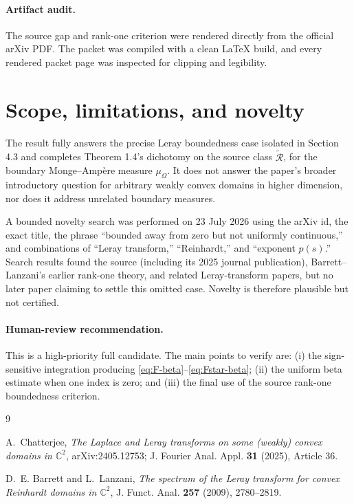 \documentclass[11pt]{article}
\newcommand{\Rclass}{\widetilde{\mathcal R}}
\begin{document}
\paragraph{Artifact audit.}
The source gap and rank-one criterion were rendered directly from the
official arXiv PDF.  The packet was compiled with a clean LaTeX build, and
every rendered packet page was inspected for clipping and legibility.

\section{Scope, limitations, and novelty}

The result fully answers the precise Leray boundedness case isolated in
Section 4.3 and completes Theorem 1.4's dichotomy on the source class
\(\Rclass\), for the boundary Monge--Amp\`ere measure \(\mu_\Omega\).
It does not answer the paper's broader introductory question for arbitrary
weakly convex domains in higher dimension, nor does it address unrelated
boundary measures.

A bounded novelty search was performed on 23 July 2026 using the arXiv id,
the exact title, the phrase ``bounded away from zero but not uniformly
continuous,'' and combinations of ``Leray transform,'' ``Reinhardt,'' and
``exponent \(p(s)\).''  Search results found the source (including its 2025
journal publication), Barrett--Lanzani's earlier rank-one theory, and related
Leray-transform papers, but no later paper claiming to settle this omitted
case.  Novelty is therefore plausible but not certified.

\paragraph{Human-review recommendation.}
This is a high-priority full candidate.  The main points to verify are:
(i) the sign-sensitive integration producing
\eqref{eq:F-beta}--\eqref{eq:Fstar-beta};
(ii) the uniform beta estimate when one index is zero; and
(iii) the final use of the source rank-one boundedness criterion.

\begin{thebibliography}{9}

A.~Chatterjee,
\emph{The Laplace and Leray transforms on some (weakly) convex domains in
\(\mathbb C^2\)},
arXiv:2405.12753; J. Fourier Anal. Appl. \textbf{31} (2025), Article 36.

D.~E. Barrett and L.~Lanzani,
\emph{The spectrum of the Leray transform for convex Reinhardt domains in
\(\mathbb C^2\)},
J. Funct. Anal. \textbf{257} (2009), 2780--2819.

\end{thebibliography}
\end{document}
